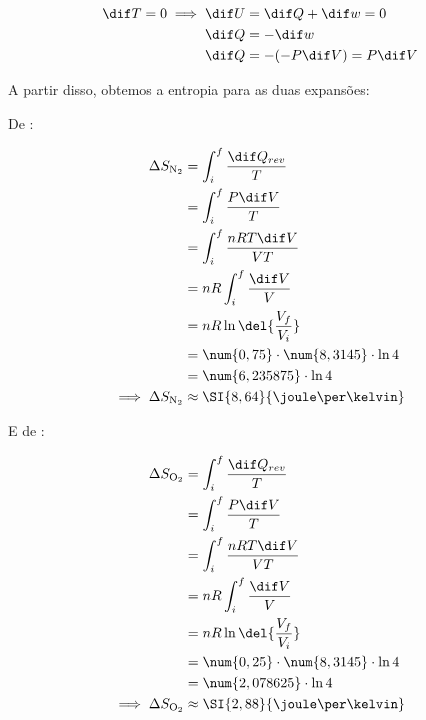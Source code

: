 \documentclass{IMTexam}
\begin{document}
\begin{questions}
\begin{parts}
\begin{solution}
                \begin{align*}
                    \dif T = 0 \implies \dif U & = \dif Q + \dif w = 0 \\
                    \dif Q & = -\dif w \\
                    \dif Q & = - (-P\dif V) = P\dif V
                \end{align*}

                A partir disso, obtemos a entropia para as duas expansões:

                \begin{multi}

                    De :

                    \begin{align*}
                        \Delta S_{\ce{N2}} & = \int_i^f \dfrac{\dif Q_{rev}}{T} \\
                        & = \int_i^f \dfrac{P\dif V}{T} \\
                        & = \int_i^f \dfrac{nRT\dif V}{VT} \\
                        & = nR \int_i^f \dfrac{\dif V}{V} \\
                        & = nR\ln\del{\dfrac{V_f}{V_i}} \\
                        & = \num{0,75} \cdot \num{8,3145} \cdot \ln 4 \\
                        & = \num{6,235875} \cdot \ln 4 \\
                        \implies\Delta S_{\ce{N2}} & \approx \SI{8,64}{\joule\per\kelvin}
                    \end{align*}

                    \nextcol

                    E de :

                    \begin{align*}
                        \Delta S_{\ce{O2}} & = \int_i^f \dfrac{\dif Q_{rev}}{T} \\
                        & = \int_i^f \dfrac{P\dif V}{T} \\
                        & = \int_i^f \dfrac{nRT\dif V}{VT} \\
                        & = nR \int_i^f \dfrac{\dif V}{V} \\
                        & = nR\ln\del{\dfrac{V_f}{V_i}} \\
                        & = \num{0,25} \cdot \num{8,3145} \cdot \ln 4 \\
                        & = \num{2,078625} \cdot \ln 4 \\
                        \implies \Delta S_{\ce{O2}} & \approx \SI{2,88}{\joule\per\kelvin}
                    \end{align*}


\end{multi}
\end{solution}
\end{parts}
\end{questions}
\end{document}
